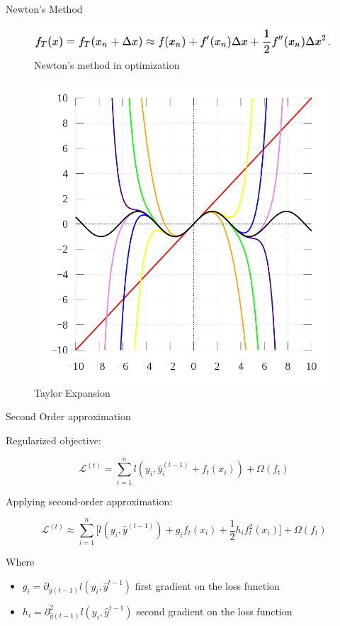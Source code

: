 \documentclass{beamer}
\begin{document}
\begin{frame}{Newton's Method}

\begin{figure}
\centering
\includegraphics[width=0.7\linewidth]{img/taylor_expansion}
\caption{Newton's method in optimization}
\label{fig:taylor_expansion}
\end{figure}

\begin{figure}
	\centering
	\includegraphics[width=0.5\linewidth]{img/example_approx}
	\caption{Taylor Expansion}
	\label{fig:taylor_expansion}
\end{figure}
\end{frame}

\begin{frame}{Second Order approximation}
	
Regularized objective:

	\begin{equation*}
	\mathcal{L}^{(t)} = \sum_{i=1}^{n} l(y_i, \hat{y}_i^{(t-1)} + f_t(x_i)) + \Omega(f_t)
	\end{equation*}
		
Applying second-order approximation:
	
	\begin{equation*}
	\mathcal{L}^{(t)} \approx 
	\sum_{i=1}^{n} 
	\big[ 
		l(y_i, \hat{y}^{(t-1)}) +
		g_i f_t(x_i) + 
		\frac{1}{2} h_i f_t^2(x_i) 
	\big] +
	\Omega(f_t)
	\end{equation*}

Where
\begin{itemize}
	\item $ g_i = \partial_{\hat{y}(t-1)} l(y_i, \hat{y}^{t-1})$ first gradient on the loss function
	\item $h_i = \partial^2_{\hat{y}(t-1)} l(y_i, \hat{y}^{t-1})$ second gradient on the loss function
\end{itemize}

\end{frame}
\end{document}
